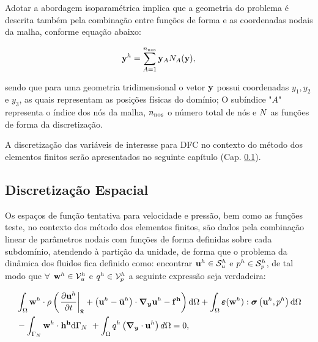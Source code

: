\documentclass[tese_patricia]{subfiles}%
\begin{document}
Adotar a abordagem isoparamétrica implica que a geometria do problema é descrita também pela combinação entre funções de forma e as coordenadas nodais da malha, conforme equação abaixo:

\begin{align}
	\mathbf{y}^{h} = \sum_{A = 1}^{n_{\mathrm{nos}}} \mathbf{y}_{A}N_{A}(\mathbf{y}),  \label{eq:interp_geo}
\end{align}

\noindent sendo que para uma geometria tridimensional o vetor $\mathbf{y}$ possui coordenadas $y_1,y_2$ e $y_3$, as quais representam as posições físicas do domínio; O subíndice "$A$" $ \ $ representa o índice dos nós da malha, $n_{\mathrm{nos}}$ o número total de nós e $N$ as funções de forma da discretização.

A discretização das variáveis de interesse para DFC no contexto do método dos elementos finitos serão apresentados no seguinte capítulo (Cap. \ref{capitulo:Cap2:DiscEspacial}).


\subsection{Discretização Espacial} \label{capitulo:Cap2:DiscEspacial}

Os espaços de função tentativa para velocidade e pressão, bem como as funções teste, no contexto dos método dos elementos finitos, são dados pela combinação linear de parâmetros nodais com funções de forma definidas sobre cada subdomínio, atendendo à partição da unidade, de forma que o problema da dinâmica dos fluidos fica definido como: encontrar $\mathbf{u}^h \in \mathcal{S}_u^h$ e $p^h \in \mathcal{S}_p^h$, de tal modo que $\forall$ $\mathbf{w}^h \in \mathcal{V}_u^h$ e $q^h \in \mathcal{V}_p^h$ a seguinte expressão seja verdadeira:

\begin{align}
	\begin{split}
		&\int_{\Omega} \mathbf{w}^h \cdot \rho \left(\left. \frac{\partial\mathbf{u}^h}{\partial t} \right|_{\bar{\mathbf{x}}} + \left(\mathbf{u}^h - \bar{\mathbf{u}}^h \right)\cdot\boldsymbol{\nabla_y} \mathbf{u}^h - \mathbf{f^h} \right) \mathrm{d} \Omega + \int_{\Omega} \bm{\varepsilon}(\mathbf{w}^h) : \boldsymbol{\sigma}\left(\mathbf{u}^h,p^h \right)  \mathrm{d} \Omega\\ & - \int_{\Gamma_{N}} \mathbf{w}^h \cdot \mathbf{h^h} \mathrm{d} \Gamma_{N} \ + \int_{\Omega} q^h \left(\boldsymbol{\nabla_y} \cdot \mathbf{u}^h\right) d \Omega = 0,  \label{eq:QM_C_forma_fraca_1} 
	\end{split}
\end{align}
\end{document}
